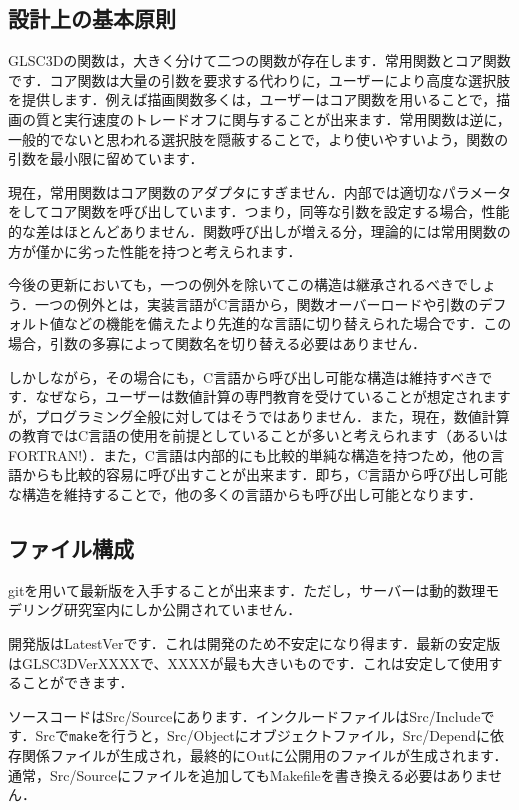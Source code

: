 \documentclass[a4paper,12pt]{jsarticle}%
\begin{document}
\subsection{設計上の基本原則}
GLSC3Dの関数は，大きく分けて二つの関数が存在します．常用関数とコア関数です．コア関数は大量の引数を要求する代わりに，ユーザーにより高度な選択肢を提供します．例えば描画関数多くは，ユーザーはコア関数を用いることで，描画の質と実行速度のトレードオフに関与することが出来ます．常用関数は逆に，一般的でないと思われる選択肢を隠蔽することで，より使いやすいよう，関数の引数を最小限に留めています．

現在，常用関数はコア関数のアダプタにすぎません．内部では適切なパラメータをしてコア関数を呼び出しています．つまり，同等な引数を設定する場合，性能的な差はほとんどありません．関数呼び出しが増える分，理論的には常用関数の方が僅かに劣った性能を持つと考えられます．

今後の更新においても，一つの例外を除いてこの構造は継承されるべきでしょう．一つの例外とは，実装言語がC言語から，関数オーバーロードや引数のデフォルト値などの機能を備えたより先進的な言語に切り替えられた場合です．この場合，引数の多寡によって関数名を切り替える必要はありません．

しかしながら，その場合にも，C言語から呼び出し可能な構造は維持すべきです．なぜなら，ユーザーは数値計算の専門教育を受けていることが想定されますが，プログラミング全般に対してはそうではありません．また，現在，数値計算の教育ではC言語の使用を前提としていることが多いと考えられます（あるいはFORTRAN!）．また，C言語は内部的にも比較的単純な構造を持つため，他の言語からも比較的容易に呼び出すことが出来ます．即ち，C言語から呼び出し可能な構造を維持することで，他の多くの言語からも呼び出し可能となります．


\subsection{ファイル構成}
gitを用いて最新版を入手することが出来ます．ただし，サーバーは動的数理モデリング研究室内にしか公開されていません．

開発版はLatestVerです．これは開発のため不安定になり得ます．最新の安定版はGLSC3DVerXXXXで、XXXXが最も大きいものです．これは安定して使用することができます．

ソースコードはSrc/Sourceにあります．インクルードファイルはSrc/Includeです．Srcで\verb|make|を行うと，Src/Objectにオブジェクトファイル，Src/Dependに依存関係ファイルが生成され，最終的にOutに公開用のファイルが生成されます．通常，Src/Sourceにファイルを追加してもMakefileを書き換える必要はありません．
\end{document}
